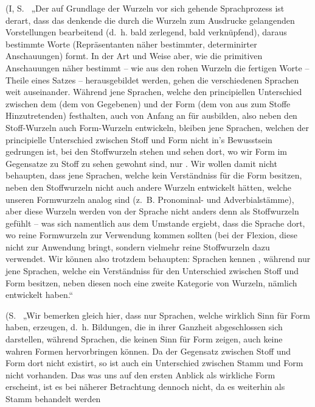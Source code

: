 (I, S.~ „Der auf Grundlage der Wurzeln vor sich gehende Sprachprozess \label{sp.338} ist derart, dass das denkende  die durch die Wurzeln zum Ausdrucke gelangenden Vorstellungen bearbeitend (d.~h. bald zerlegend, bald  verknüpfend), daraus bestimmte Worte (Repräsentanten näher bestimmter, determinirter Anschauungen) formt. In der Art und Weise aber, wie die primitiven Anschauungen näher bestimmt – wie aus den rohen Wurzeln die fertigen Worte – Theile eines Satzes – herausgebildet werden, gehen die verschiedenen Sprachen weit auseinander. Während jene Sprachen, welche den principiellen Unterschied zwischen dem  (dem von  Gegebenen) und der Form (dem von  aus zum Stoffe Hinzutretenden) festhalten, auch von Anfang an  für  ausbilden, also neben den Stoff-Wurzeln auch Form-Wurzeln entwickeln, bleiben jene Sprachen, welchen der principielle Unterschied zwischen Stoff und Form nicht in’s Bewusstsein gedrungen ist, bei den Stoffwurzeln stehen und sehen dort, wo wir Form im Gegensatze zu Stoff zu sehen gewohnt sind, nur . Wir wollen damit nicht behaupten, dass jene Sprachen, welche kein Verständniss für die Form besitzen, neben den Stoffwurzeln nicht auch andere Wurzeln entwickelt hätten, welche unseren Formwurzeln analog sind (z.~B. Pronominal- und Adverbialstämme), aber diese Wurzeln werden von der Sprache nicht anders denn als Stoffwurzeln gefühlt – was sich namentlich aus dem Umstande ergiebt, dass die Sprache dort, wo reine Formwurzeln zur Verwendung kommen sollten (bei der Flexion,  diese nicht zur Anwendung bringt, sondern vielmehr reine Stoffwurzeln dazu verwendet. Wir können also trotzdem behaupten:  Sprachen kennen , während nur jene Sprachen, welche ein Verständniss für den Unterschied zwischen Stoff und Form besitzen, neben diesen noch eine zweite Kategorie von Wurzeln, nämlich  entwickelt haben.“

(S.~ „Wir bemerken gleich hier, dass nur Sprachen, welche wirklich Sinn für Form haben,  erzeugen, d.~h. Bildungen, die in ihrer Ganzheit abgeschlossen sich darstellen, während Sprachen, die keinen Sinn für Form zeigen, auch keine wahren Formen hervorbringen können. Da der Gegensatz zwischen Stoff und Form dort nicht existirt, so ist auch ein Unterschied zwischen Stamm und Form nicht vorhanden. Das was uns auf den ersten Anblick als wirkliche \label{fp.326} Form erscheint, ist es bei näherer Betrachtung dennoch nicht, da es weiterhin als Stamm behandelt werden 

